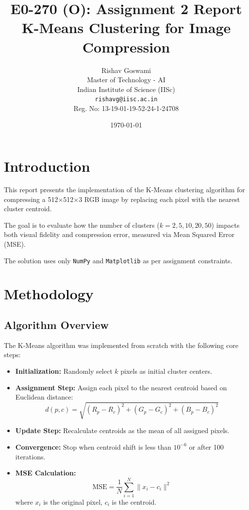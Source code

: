 \documentclass{article}
\title{\textbf{E0-270 (O): Assignment 2 Report} \\ \Large K-Means Clustering for Image Compression}
\author{
    Rishav Goswami \\
    \normalsize Master of Technology - AI \\
    \normalsize Indian Institute of Science (IISc) \\
    \texttt{rishavg@iisc.ac.in} \\
    \normalsize Reg. No: 13-19-01-19-52-24-1-24708
}
\date{\today}
\begin{document}
\maketitle

\section{Introduction}
\begin{adjustwidth}{1cm}{}
This report presents the implementation of the K-Means clustering algorithm for compressing a 512×512×3 RGB image by replacing each pixel with the nearest cluster centroid.

The goal is to evaluate how the number of clusters (\(k = 2, 5, 10, 20, 50\)) impacts both visual fidelity and compression error, measured via Mean Squared Error (MSE). 

The solution uses only \texttt{NumPy} and \texttt{Matplotlib} as per assignment constraints.
\end{adjustwidth}

\section{Methodology}
\subsection{Algorithm Overview}
\begin{adjustwidth}{1cm}{}
The K-Means algorithm was implemented from scratch with the following core steps:
\begin{itemize}
    \item \textbf{Initialization:} Randomly select \(k\) pixels as initial cluster centers.
    \item \textbf{Assignment Step:} Assign each pixel to the nearest centroid based on Euclidean distance:
    \[
        d(p, c) = \sqrt{(R_p-R_c)^2 + (G_p-G_c)^2 + (B_p-B_c)^2}
    \]
    \item \textbf{Update Step:} Recalculate centroids as the mean of all assigned pixels.
    \item \textbf{Convergence:} Stop when centroid shift is less than \(10^{-6}\) or after 100 iterations.
    \item \textbf{MSE Calculation:}
    \[
        \text{MSE} = \frac{1}{N} \sum_{i=1}^N \|x_i - c_i\|^2
    \]
    where \(x_i\) is the original pixel, \(c_i\) is the centroid.
\end{itemize}
\end{adjustwidth}
\end{document}
